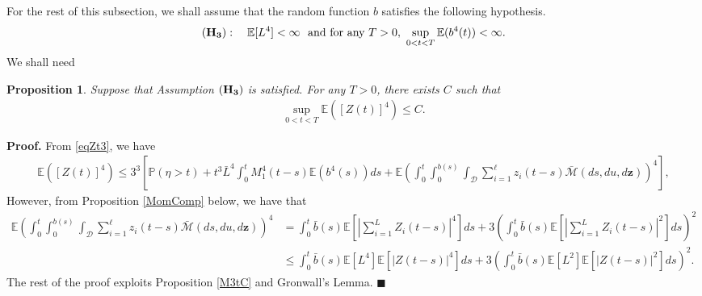 \documentclass[11pt]{article}
\def\P{{\mathbb P}}
\def\E{{\mathbb E}}
\def\D {\mathcal{D}}
\def\L {\bar{L}}
\def\z {\mathbf{z}}
\newtheorem{proposition}[theorem]{Proposition}
\newenvironment{proof}[1][Proof.]{\textbf{#1} }{\hfill $\blacksquare$}
\begin{document}
For the rest of this subsection, we shall assume that the random function $b$ satisfies the following hypothesis.
\begin{equation*}
{(\bf H_3)}  :  \quad \E[L^4]<\infty\ \text{ and for any} \ T>0, \  \sup_{0<t<T} \E(b^4(t))<\infty.
\end{equation*} 
We shall need
 \begin{proposition}\label{M4tC}
Suppose that Assumption ${(\bf H_3)}$ is satisfied. For any $T>0$, there exists $C$ such that 
 \begin{align*}
\sup_{0<t<T} \E([Z(t)]^4)\le C.
\end{align*} 
  \end{proposition} 
\begin{proof}
From \eqref{eqZt3}, we have 
  \begin{align*}
\E([Z(t)]^4) \le 3^3 \left[ \P(\eta >t)+t^3 \L^4\int_0^t M_1^4(t-s) \E(b^4(s)) ds  + \E\left(\int_0^t \int_0^{b(s)} \int_{\D}\sum_{i=1}^\ell z_i(t-s)  \bar{\mathcal{M}}(ds,du,d\z)\right)^4 \right],
\end{align*} 
However, from Proposition \ref{MomComp} below, we have that 
\begin{align*}
\E\left(\int_0^t \int_0^{b(s)} \int_{\D}\sum_{i=1}^\ell z_i(t-s)  \bar{\mathcal{M}}(ds,du,d\z)\right)^4&= \int_0^t  \bar{b}(s)\E\left[\left|\sum_{i=1}^LZ_i(t-s)\right|^4\right] ds+ 3 \left( \int_0^t  \bar{b}(s)\E\left[\left|\sum_{i=1}^LZ_i(t-s)\right|^2\right] ds \right)^2\\
&\le  \int_0^t  \bar{b}(s)\E[L^4]\E[|Z(t-s)|^4]ds+3\left( \int_0^t  \bar{b}(s) \E[L^2]\E[|Z(t-s)|^2]ds \right)^2.
\end{align*}
The rest of the proof exploits Proposition \ref{M3tC} and Gronwall's Lemma. 
\end{proof}
\end{document}
